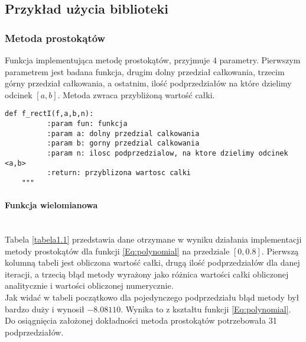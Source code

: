 \documentclass[12pt,twoside]{article}
\begin{document}
\clearpage
\subsection{Przykład użycia biblioteki}


\subsubsection{Metoda prostokątów}
	Funkcja implementująca metodę prostokątów, przyjmuje 4 parametry. Pierwszym parametrem jest badana funkcja, drugim dolny przedział całkowania, trzecim górny przedział całkowania, a ostatnim, ilość podprzedziałów na które dzielimy odcinek $[a,b]$. Metoda zwraca przybliżoną wartość całki.
	
\begin{lstlisting}[caption={Kod w języku python implementujący metodę prostokątów}]
def f_rectI(f,a,b,n):
 	      :param fun: funkcja
          :param a: dolny przedzial calkowania
          :param b: gorny przedzial calkowania
          :param n: ilosc podprzedzialow, na ktore dzielimy odcinek <a,b>
          :return: przyblizona wartosc calki
    """
\end{lstlisting}
\label{Listing 6}

\paragraph{Funkcja wielomianowa}\mbox{} \\

Tabela \ref{tabela1.1} przedstawia dane otrzymane w wyniku działania implementacji metody prostokątów dla funkcji \eqref{Eq:polynomial} na przedziale $[0,0.8]$.
	Pierwszą kolumną tabeli jest obliczona wartość całki, drugą ilość podprzedziałów dla danej iteracji, a trzecią błąd metody wyrażony jako różnica wartości całki obliczonej analitycznie i wartości obliczonej numerycznie.\\
	Jak widać w tabeli początkowo dla pojedynczego podprzedziału błąd metody był bardzo duży i wynosił $-8.08110$. Wynika to z kształtu funkcji \eqref{Eq:polynomial}.\\
	Do osiągnięcia założonej dokładności metoda prostokątów potrzebowała 31 podprzedziałów.
\end{document}
